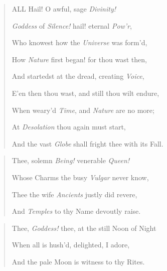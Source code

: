 \documentclass[a4paper, 11pt, oneside]{article}
\begin{document}
\bigskip

\begin{quotation}\scriptsize
\hspace*{10mm}ALL Hail! O awful, sage \emph{Divinity!}

\emph{Goddess} of \emph{Silence!} hail! eternal \emph{Pow'r},

Who knowest how the \emph{Universe} was form'd,

How \emph{Nature} first began! for thou wast then,

And startedst at the dread, creating \emph{Voice},

E'en then thou wast, and still thou wilt endure,

When weary'd \emph{Time}, and \emph{Nature} are no more;

At \emph{Desolation} thou again must start,

And the vast \emph{Globe} shall fright thee with its Fall.
\end{quotation}
\begin{quotation}\scriptsize
\hspace*{10mm}Thee, solemn \emph{Being!} venerable \emph{Queen!}

Whose Charms the busy \emph{Vulgar} never know,

Thee the wife \emph{Ancients} justly did revere,

And \emph{Temples} to thy Name devoutly raise.
\end{quotation}
\begin{quotation}\scriptsize
\hspace*{10mm}Thee, \emph{Goddess!} thee, at the still Noon of Night

When all is hush'd, delighted, I adore,

And the pale Moon is witness to thy Rites.
\end{quotation}
\end{document}
